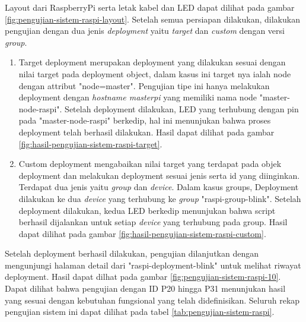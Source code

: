 Layout dari RaspberryPi serta letak kabel dan LED dapat dilihat pada gambar \ref{fig:pengujian-sistem-raspi-layout}. Setelah semua persiapan dilakukan, dilakukan pengujian dengan dua jenis \textit{deployment} yaitu \textit{target} dan \textit{custom} dengan versi \textit{group}.
\begin{enumerate}
  \item Target deployment merupakan deployment yang dilakukan sesuai dengan nilai target pada deployment object, dalam kasus ini target nya ialah node dengan attribut "node=master". Pengujian tipe ini hanya melakukan deployment dengan \textit{hostname masterpi} yang memiliki nama node "master-node-raspi". Setelah deployment dilakukan, LED yang terhubung dengan pin pada "master-node-raspi" berkedip, hal ini menunjukan bahwa proses deployment telah berhasil dilakukan. Hasil dapat dilihat pada gambar \ref{fig:hasil-pengujian-sistem-raspi-target}.
  \item Custom deployment mengabaikan nilai target yang terdapat pada objek deployment dan melakukan deployment sesuai jenis serta id yang diinginkan. Terdapat dua jenis yaitu \textit{group} dan \textit{device}. Dalam kasus groups, Deployment dilakukan ke dua \textit{device} yang terhubung ke \textit{group} "raspi-group-blink". Setelah deployment dilakukan, kedua LED berkedip menunjukan bahwa script berhasil dijalankan untuk setiap \textit{device} yang terhubung pada group. Hasil dapat dilihat pada gambar \ref{fig:hasil-pengujian-sistem-raspi-custom}.
\end{enumerate}

Setelah deployment berhasil dilakukan, pengujian dilanjutkan dengan mengunjungi halaman detail dari "raspi-deployment-blink" untuk melihat riwayat deployment. Hasil dapat dilhat pada gambar \ref{fig:pengujian-sistem-raspi-10}. Dapat dilihat bahwa pengujian dengan ID P20 hingga P31 menunjukan hasil yang sesuai dengan kebutuhan fungsional yang telah didefinisikan. Seluruh rekap pengujian sistem ini dapat dilihat pada tabel \ref{tab:pengujian-sistem-raspi}.